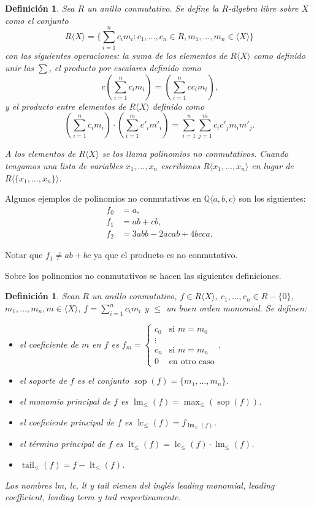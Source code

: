 \documentclass[12pt]{report}
\theoremstyle{customstyle}
\newtheorem{definition}[theorem]{Definición}
\theoremstyle{factstyle}
\DeclareMathOperator{\sop}{sop}
\DeclareMathOperator{\lm}{lm}
\DeclareMathOperator{\lc}{lc}
\DeclareMathOperator{\lt}{lt}
\DeclareMathOperator{\tail}{tail}
\begin{document}
\begin{definition}
  Sea $R$ un anillo conmutativo. Se define la $R$-álgebra libre sobre $X$ como el conjunto
  \[ R⟨X⟩ = \{∑_{i = 1}^n c_i m_i : c_1, …, c_n ∈ R, m_1, …, m_n ∈ ⟨X⟩\}\]
  con las siguientes operaciones: la suma de los elementos de $R⟨X⟩$ como definido unir las $∑$, el producto por escalares definido como
  \[ c (∑_{i = 1}^n c_i m_i) = (∑_{i = 1}^n c c_i m_i) \text{,}\]
  y el producto entre elementos de $R⟨X⟩$ definido como
  \[ (∑_{i = 1}^n c_i m_i) · (∑_{i = 1}^m c'_i m'_i) = ∑_{i = 1}^n ∑_{j = 1}^m c_i c'_j m_i m'_j \text{.}\]

  A los elementos de $R⟨X⟩$ se los llama polinomios no conmutativos. Cuando tengamos una lista de variables $x_1, …, x_n$ escribimos $R⟨x_1, …, x_n⟩$ en lugar de $R⟨\{x_1, …, x_n\}⟩$.
\end{definition}

Algunos ejemplos de polinomios no conmutativos en $ℚ⟨a, b, c⟩$ son los siguientes:
\begin{align*}
  f_0 &= a \text{,} \\
  f_1 &= ab + cb \text{,} \\
  f_2 &= 3 abb - 2 acab + 4 bcca \text{.}
\end{align*}

\noindent Notar que $f_1 ≠ ab + bc$ ya que el producto es no conmutativo.

Sobre los polinomios no conmutativos se hacen las siguientes definiciones.

\begin{definition}\label{def:cosas de polinomios}
  Sean $R$ un anillo conmutativo, $f ∈ R⟨X⟩$, $c_1, …, c_n ∈ R - \{0\}$, $m_1, …, m_n, m ∈ ⟨X⟩$, $f = ∑_{i = 1}^n c_i m_i$ y $≤$ un buen orden monomial. Se definen:
  \begin{itemize}
    \item el coeficiente de $m$ en $f$ es $f_m = \begin{cases} c_0&\text{si }m = m_0 \\ ⋮ & \\ c_n&\text{si }m = m_n \\ 0&\text{en otro caso} \end{cases} $.
    \item el soporte de $f$ es el conjunto $\sop(f) = \{m_1, …, m_n\}$.
    \item el monomio principal de $f$ es $\lm_≤(f) = \max_≤(\sop(f))$.
    \item el coeficiente principal de $f$ es $\lc_≤(f) = f_{\lm_≤(f)}$.
    \item el término principal de $f$ es $\lt_≤(f) = \lc_≤(f) · \lm_≤(f)$.
    \item $\tail_≤(f) = f - \lt_≤(f)$.
  \end{itemize}

  Los nombres lm, lc, lt y tail vienen del inglés leading monomial, leading coefficient, leading term y tail respectivamente.
\end{definition}
\end{document}
